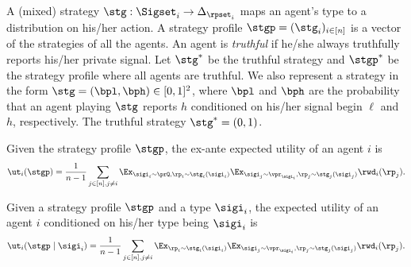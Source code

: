 A (mixed) strategy $\stg: \Sigset_i \to \Delta_{\rpset_i}$ maps an agent's type to a distribution on his/her action. A strategy profile $\stgp = (\stg_i)_{i \in [n]}$ is a vector of the strategies of all the agents. An agent is {\em truthful} if he/she always truthfully reports his/her private signal. Let $\stg^*$ be the truthful strategy and $\stgp^*$ be the strategy profile where all agents are truthful. 
We also represent a strategy in the form $\stg = (\bpl, \bph) \in [0, 1]^2$, where $\bpl$ and $\bph$ are the probability that an agent playing $\stg$ reports $h$ conditioned on his/her signal begin $\ell$  and $h$, respectively. The truthful strategy $\stg^* = (0, 1)$.

Given the strategy profile $\stgp$, the ex-ante expected utility of an agent $i$ is
\begin{equation*}
    \ut_i(\stgp) = \frac{1}{n-1}\sum_{j\in [n], j\neq i} \Ex_{\sigi_i \sim \prQ
    , \rp_i \sim \stg_i(\sigi_i)} \Ex_{\sigi_j \sim \vpr_{\sigi_i}, \rp_j \sim \stg_j(\sigi_j)} \rwd_i(\rp_j). 
\end{equation*}

Given a strategy profile $\stgp$ and a type $\sigi_i$, the \qi{} expected utility of an agent $i$ conditioned on his/her type being $\sigi_i$ is 
\begin{equation*}
    \ut_i(\stgp\mid \sigi_i) = \frac{1}{n-1}\sum_{j\in [n], j\neq i} \Ex_{\rp_i \sim \stg_i(\sigi_i)} \Ex_{\sigi_j \sim \vpr_{\sigi_i}, \rp_j \sim \stg_j(\sigi_j)} \rwd_i(\rp_j). 
\end{equation*}

